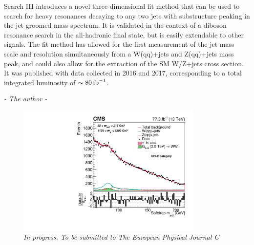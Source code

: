 \begin{centering}
{\newline
Search III introduces a novel three-dimensional fit method that can be used to search for heavy resonances decaying to any two jets with substructure peaking in the jet groomed mass spectrum. It is validated in the context of a diboson resonance search in the all-hadronic final state, but is easily extendable to other signals. The fit method has allowed for the first measurement of the jet mass scale and resolution simultaneously from a W(qq)+jets and Z(qq)+jets mass peak, and could also allow for the extraction of the SM W/Z+jets cross section. It was published with data collected in 2016 and 2017, corresponding to a total integrated luminosity of $\sim 80 \mbox{\ensuremath{\,\text{fb}^\text{$-$1}}}$.}
\end{centering}
 \begin{flushright} \textit{- The author - } \end{flushright}
\begin{figure}[h!]
    \centering
    \vspace*{10mm}
    \includegraphics[height=6.5cm]{figures/analysis/search3/B2G-18-002/PostFitComboHPLP_Y-Proj__x___0_-1_z___0_-1.pdf}
    \vspace*{10mm}
    \caption*{\footnotesize{\textit{In progress. To be submitted to The European Physical Journal C}}}
\end{figure}

\clearpage




